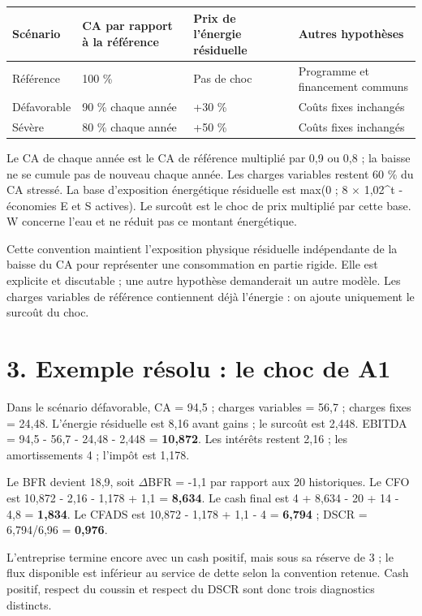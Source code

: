 \documentclass[12pt,a4paper]{article}
\begin{document}
\Needspace{180pt}
\begin{longtable}{p{3.67cm}p{3.67cm}p{3.67cm}p{3.67cm}}
\toprule
Scénario & CA par rapport à la référence & Prix de l’énergie résiduelle & Autres hypothèses \\
\midrule\endhead
Référence & 100 \% & Pas de choc & Programme et financement communs \\
Défavorable & 90 \% chaque année & +30 \% & Coûts fixes inchangés \\
Sévère & 80 \% chaque année & +50 \% & Coûts fixes inchangés \\
\bottomrule
\end{longtable}

Le CA de chaque année est le CA de référence multiplié par 0,9 ou 0,8 ; la baisse ne se cumule pas de nouveau chaque année. Les charges variables restent 60 \% du CA stressé. La base d’exposition énergétique résiduelle est max(0 ; 8 $\times$ 1,02\textasciicircum{}t - économies E et S actives). Le surcoût est le choc de prix multiplié par cette base. W concerne l’eau et ne réduit pas ce montant énergétique.


Cette convention maintient l’exposition physique résiduelle indépendante de la baisse du CA pour représenter une consommation en partie rigide. Elle est explicite et discutable ; une autre hypothèse demanderait un autre modèle. Les charges variables de référence contiennent déjà l’énergie : on ajoute uniquement le surcoût du choc.

\section*{3. Exemple résolu : le choc de A1}
Dans le scénario défavorable, CA = 94,5 ; charges variables = 56,7 ; charges fixes = 24,48. L’énergie résiduelle est 8,16 avant gains ; le surcoût est 2,448. EBITDA = 94,5 - 56,7 - 24,48 - 2,448 = \textbf{10,872}. Les intérêts restent 2,16 ; les amortissements 4 ; l’impôt est 1,178.


Le BFR devient 18,9, soit $\Delta$BFR = -1,1 par rapport aux 20 historiques. Le CFO est 10,872 - 2,16 - 1,178 + 1,1 = \textbf{8,634}. Le cash final est 4 + 8,634 - 20 + 14 - 4,8 = \textbf{1,834}. Le CFADS est 10,872 - 1,178 + 1,1 - 4 = \textbf{6,794} ; DSCR = 6,794/6,96 = \textbf{0,976}.


L’entreprise termine encore avec un cash positif, mais sous sa réserve de 3 ; le flux disponible est inférieur au service de dette selon la convention retenue. Cash positif, respect du coussin et respect du DSCR sont donc trois diagnostics distincts.
\end{document}
